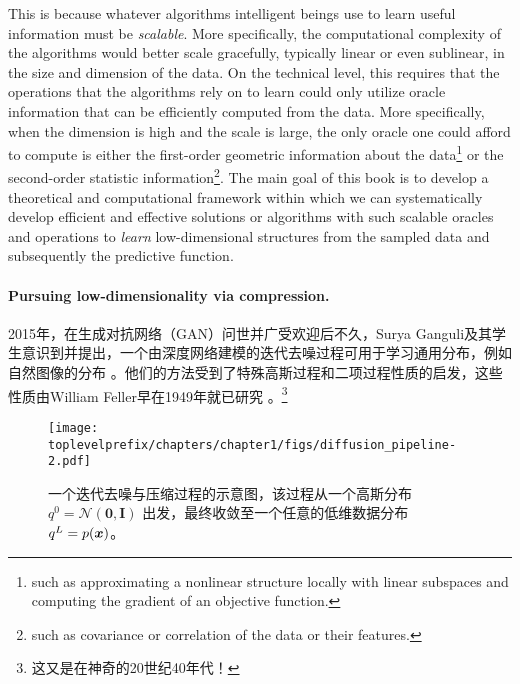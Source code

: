 \documentclass[../../book-main.tex]{subfiles}
\begin{document}
This is because whatever algorithms intelligent beings use to learn useful information must be {\em scalable}. More specifically, the computational complexity of the algorithms would better scale gracefully, typically linear or even sublinear, in the size and dimension of the data. On the technical level, this requires that the operations that the algorithms rely on to learn could only utilize oracle information that can be efficiently computed from the data. More specifically, when the dimension is high and the scale is large, the only oracle one could afford to compute is either the first-order geometric information about the data\footnote{such as approximating a nonlinear structure locally with linear subspaces and computing the gradient of an objective function.} or the second-order statistic information\footnote{such as covariance or correlation of the data or their features.}.
The main goal of this book is to develop a theoretical and computational framework within which we can systematically develop efficient and effective solutions or algorithms with such scalable oracles and operations to {\em learn} low-dimensional structures from the sampled data and subsequently the predictive function.


\paragraph{Pursuing low-dimensionality via compression.}

2015年，在生成对抗网络（GAN）问世并广受欢迎后不久，Surya Ganguli及其学生意识到并提出，一个由深度网络建模的迭代去噪过程可用于学习通用分布，例如自然图像的分布 \cite{Sohl-Dickstein2015}。他们的方法受到了特殊高斯过程和二项过程性质的启发，这些性质由William Feller早在1949年就已研究 \cite{Feller1949OnTT}。\footnote{这又是在神奇的20世纪40年代！} 

\begin{figure}[t]
    \centering
    \texttt{[image: \\toplevelprefix/chapters/chapter1/figs/diffusion\_pipeline-2.pdf]}
    \caption{一个迭代去噪与压缩过程的示意图，该过程从一个高斯分布 $q^0 = \mathcal{N}(\boldsymbol{0}, \boldsymbol{I})$ 出发，最终收敛至一个任意的低维数据分布 $q^L = p(\bm{x})$。}
    \label{fig:diffusion}
\end{figure}
\end{document}
